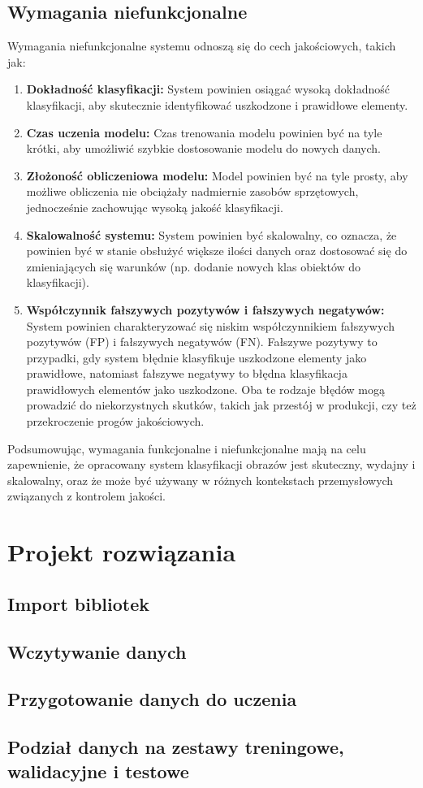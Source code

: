\subsection{Wymagania niefunkcjonalne}
Wymagania niefunkcjonalne systemu odnoszą się do cech jakościowych, takich jak:

\begin{enumerate}

\item \textbf{Dokładność klasyfikacji:} System powinien osiągać wysoką dokładność klasyfikacji, aby skutecznie identyfikować uszkodzone i prawidłowe elementy.

\item \textbf{Czas uczenia modelu:} Czas trenowania modelu powinien być na tyle krótki, aby umożliwić szybkie dostosowanie modelu do nowych danych.

\item \textbf{Złożoność obliczeniowa modelu:} Model powinien być na tyle prosty, aby możliwe obliczenia nie obciążały nadmiernie zasobów sprzętowych, jednocześnie zachowując wysoką jakość klasyfikacji.

\item \textbf{Skalowalność systemu:} System powinien być skalowalny, co oznacza, że powinien być w stanie obsłużyć większe ilości danych oraz dostosować się do zmieniających się warunków (np. dodanie nowych klas obiektów do klasyfikacji).

\item \textbf{Współczynnik fałszywych pozytywów i fałszywych negatywów:} System powinien charakteryzować się niskim współczynnikiem fałszywych pozytywów (FP) i fałszywych negatywów (FN). Fałszywe pozytywy to przypadki, gdy system błędnie klasyfikuje uszkodzone elementy jako prawidłowe, natomiast fałszywe negatywy to błędna klasyfikacja prawidłowych elementów jako uszkodzone. Oba te rodzaje błędów mogą prowadzić do niekorzystnych skutków, takich jak przestój w produkcji, czy też przekroczenie progów jakościowych.

\end{enumerate}

Podsumowując, wymagania funkcjonalne i niefunkcjonalne mają na celu zapewnienie, że opracowany system klasyfikacji obrazów jest skuteczny, wydajny i skalowalny, oraz że może być używany w różnych kontekstach przemysłowych związanych z kontrolem jakości.

\section{Projekt rozwiązania}
\subsection{Import bibliotek}
\subsection{Wczytywanie danych}
\subsection{Przygotowanie danych do uczenia}
\subsection{Podział danych na zestawy treningowe, walidacyjne i testowe}